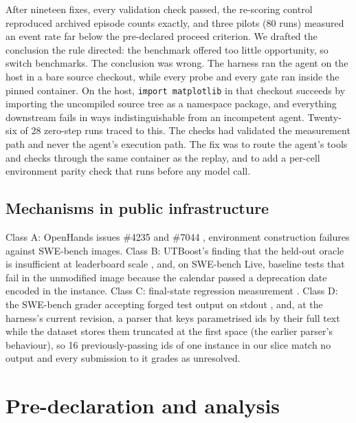 \documentclass{article}
\begin{document}
After nineteen fixes, every validation check passed, the re-scoring control reproduced archived episode counts exactly, and three pilots (80 runs) measured an event rate far below the pre-declared proceed criterion. We drafted the conclusion the rule directed: the benchmark offered too little opportunity, so switch benchmarks. The conclusion was wrong. The harness ran the agent on the host in a bare source checkout, while every probe and every gate ran inside the pinned container. On the host, \texttt{import matplotlib} in that checkout succeeds by importing the uncompiled source tree as a namespace package, and everything downstream fails in ways indistinguishable from an incompetent agent. Twenty-six of 28 zero-step runs traced to this. The checks had validated the measurement path and never the agent's execution path. The fix was to route the agent's tools and checks through the same container as the replay, and to add a per-cell environment parity check that runs before any model call.

\subsection{Mechanisms in public infrastructure}

Class A: OpenHands issues \#4235 and \#7044 \cite{ref31}, environment construction failures against SWE-bench images. Class B: UTBoost's finding that the held-out oracle is insufficient at leaderboard scale \cite{ref7}, and, on SWE-bench Live, baseline tests that fail in the unmodified image because the calendar passed a deprecation date encoded in the instance. Class C: final-state regression measurement \cite{ref8}. Class D: the SWE-bench grader accepting forged test output on stdout \cite{ref30}, and, at the harness's current revision, a parser that keys parametrised ids by their full text while the dataset stores them truncated at the first space (the earlier parser's behaviour), so 16 previously-passing ids of one instance in our slice match no output and every submission to it grades as unresolved.

\section{Pre-declaration and analysis}
\end{document}
